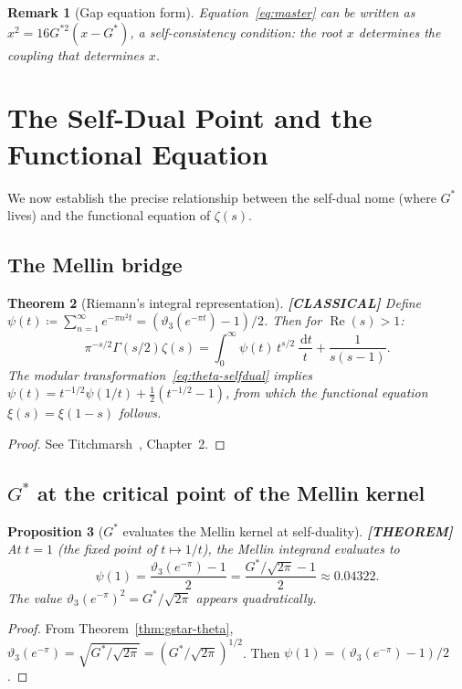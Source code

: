 \documentclass[11pt]{article}
\theoremstyle{tight}
\newtheorem{theorem}{Theorem}[section]
\newtheorem{proposition}[theorem]{Proposition}
\theoremstyle{plainroman}
\newtheorem{remark}[theorem]{Remark}
\newcommand{\dd}{\,\mathrm{d}}
\begin{document}
\begin{remark}[Gap equation form]
Equation~\eqref{eq:master} can be written as $x^2=16G^{*2}(x-G^*)$, a self-consistency condition: the root $x$ determines the coupling that determines $x$.
\end{remark}

\section{The Self-Dual Point and the Functional Equation}

We now establish the precise relationship between the self-dual nome (where $G^*$ lives) and the functional equation of $\zeta(s)$.

\subsection{The Mellin bridge}

\begin{theorem}[Riemann's integral representation]\label{thm:mellin}
\textbf{[CLASSICAL]}
Define $\psi(t)\coloneqq\sum_{n=1}^\infty e^{-\pi n^2 t}=(\vartheta_3(e^{-\pi t})-1)/2$.
Then for $\operatorname{Re}(s)>1$:
\begin{equation}\label{eq:mellin}
\pi^{-s/2}\Gamma(s/2)\zeta(s)=\int_0^\infty \psi(t)\,t^{s/2}\,\frac{\dd t}{t}+\frac{1}{s(s-1)}.
\end{equation}
The modular transformation~\eqref{eq:theta-selfdual} implies $\psi(t)=t^{-1/2}\psi(1/t)+\frac{1}{2}(t^{-1/2}-1)$, from which the functional equation $\xi(s)=\xi(1-s)$ follows.
\end{theorem}
\begin{proof}
See Titchmarsh~\cite{titchmarsh}, Chapter~2.
\end{proof}

\subsection{$G^*$ at the critical point of the Mellin kernel}

\begin{proposition}[$G^*$ evaluates the Mellin kernel at self-duality]\label{prop:mellin-gstar}
\textbf{[THEOREM]}
At $t=1$ (the fixed point of $t\mapsto 1/t$), the Mellin integrand evaluates to
\[
\psi(1)=\frac{\vartheta_3(e^{-\pi})-1}{2}=\frac{G^*/\sqrt{2\pi}-1}{2}\approx 0.04322.
\]
The value $\vartheta_3(e^{-\pi})^2=G^*/\sqrt{2\pi}$ appears quadratically.
\end{proposition}
\begin{proof}
From Theorem~\ref{thm:gstar-theta}, $\vartheta_3(e^{-\pi})=\sqrt{G^*/\sqrt{2\pi}}=(G^*/\sqrt{2\pi})^{1/2}$.
Then $\psi(1)=(\vartheta_3(e^{-\pi})-1)/2$.
\end{proof}
\end{document}
